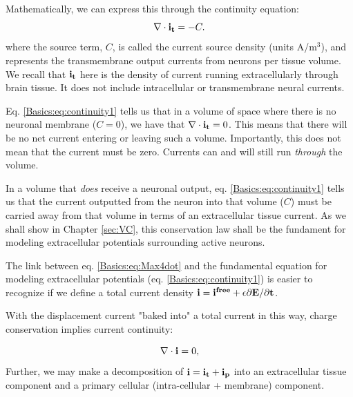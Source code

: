 \section{}
\label{sec:Basics:C} 
 Mathematically, we can express this through the continuity equation:
\begin{equation}
\nabla \cdot {\bf i_t} = -C.
\label{Basics:eq:continuity1}
\end{equation}
where the source term, $C$, is called the current source density (units A/m$^3$), and represents  the transmembrane output currents from neurons per tissue volume. We recall that ${\bf i_t}$ here is the density of current running extracellularly through brain tissue. It does not include intracellular or transmembrane neural currents. 

Eq. \ref{Basics:eq:continuity1} tells us that in a volume of space where there is no neuronal membrane ($C = 0$), we have that $\nabla \cdot {\bf i_t} = 0$. This means that there will be no net current entering or leaving such a volume. Importantly, this does not mean that the current must be zero. Currents can and will still run \textit{through} the volume.

In a volume that \textit{does} receive a neuronal output, eq. \ref{Basics:eq:continuity1} tells us that the current outputted from the neuron into that volume ($C$) must be carried away from that volume in terms of an extracellular tissue current. As we shall show in Chapter \ref{sec:VC}, this conservation law shall be the fundament for modeling extracellular potentials surrounding active neurons.



The link between eq. \ref{Basics:eq:Max4dot} and the fundamental equation for modeling extracellular potentials (eq. \ref{Basics:eq:continuity1}) is easier to recognize if we define a total current density ${\bf i} = \bf{i^{free}} +\epsilon\partial{\bf E}/\partial{t}$. 

With the displacement current "baked into" a total current in this way, charge conservation implies current continuity:

\begin{equation}
\nabla \cdot {\bf i} =  0,
\label{Basics:eq:Max4dot1}
\end{equation}
Further, we may make a decomposition of ${\bf i} = {\bf i_t} + {\bf i_p}$ into an extracellular tissue component and a primary cellular (intra-cellular + membrane) component. 

